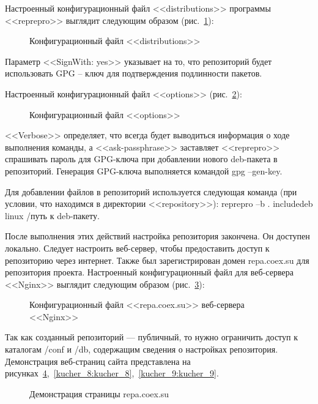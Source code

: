 Настроенный конфигурационный файл <<distributions>> программы <<reprepro>> выглядит следующим образом (рис.~\ref{kucher_4:kucher_4}):

\begin{figure}[h!]
\caption{ Конфигурационный файл <<distributions>> }
\label{kucher_4:kucher_4}
\end{figure}

Параметр <<SignWith: yes>> указывает на то, что репозиторий будет использовать GPG – ключ для подтверждения подлинности пакетов.

Настроенный конфигурационный файл <<options>> (рис.~\ref{kucher_5:kucher_5}):
	
\begin{figure}[h!]
\caption{ Конфигурационный файл <<options>> }
\label{kucher_5:kucher_5}
\end{figure}
	
<<Verbose>> определяет, что всегда будет выводиться информация о ходе выполнения команды, а <<ask-passphrase>> заставляет <<reprepro>> спрашивать пароль для GPG-ключа при добавлении нового deb-пакета в репозиторий.
Генерация GPG-ключа выполняется командой gpg --gen-key.

Для добавлении файлов в репозиторий используется следующая команда (при условии, что находимся в директории <<repository>>): reprepro –b . includedeb linux /путь к deb-пакету.

После выполнения этих действий настройка репозитория закончена. Он доступен локально. Следует настроить веб-сервер, чтобы предоставить доступ к репозиторию через интернет. Также был зарегистрирован домен repa.coex.su для репозитория проекта. Настроенный конфигурационный файл для веб-сервера <<Nginx>> выглядит следующим образом (рис.~\ref{kucher_6:kucher_6}):
	
\begin{figure}[h!]
\caption{ Конфигурационный файл <<repa.coex.su>> веб-сервера <<Nginx>> }
\label{kucher_6:kucher_6}
\end{figure}
	
Так как созданный репозиторий --- публичный, то нужно ограничить доступ к каталогам /conf и /db, содержащим сведения о настройках репозитория. Демонстрация веб-страниц сайта представлена на рисунках~\ref{kucher_7:kucher_7},~\ref{kucher_8:kucher_8},~\ref{kucher_9:kucher_9}.  
	
\begin{figure}[h!]
\caption{ Демонстрация страницы repa.coex.su }
\label{kucher_7:kucher_7}
\end{figure}
	
